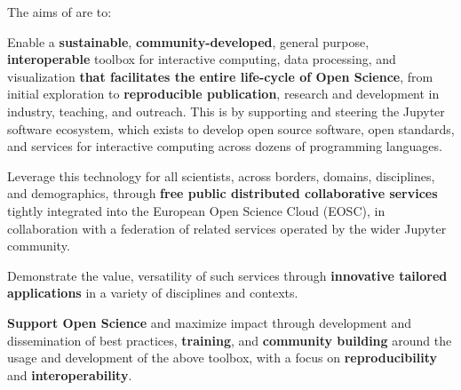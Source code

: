 
\noindent The aims of \TheProject are to:

\begin{compactenum}
\item Enable a
  \textbf{sustainable}, \textbf{community-developed}, general purpose, \textbf{interoperable} toolbox for
  interactive computing, data processing, and visualization
  \textbf{that facilitates the entire life-cycle of Open Science},
  from initial exploration to \textbf{reproducible publication}, research and development in
  industry, teaching, and outreach.
  This is by supporting and steering the Jupyter software ecosystem,
  which exists to develop open source software,
  open standards, and services for interactive computing across dozens of programming languages.

\item Leverage this technology for all scientists, across borders,
  domains, disciplines, and demographics, through
  \textbf{free public distributed collaborative services} tightly integrated
  into the European Open Science Cloud (EOSC),
  in collaboration with a federation of related services
  operated by the wider Jupyter community.

\item Demonstrate the value, versatility of such services through
  \textbf{innovative tailored applications} in a variety of disciplines and
  contexts.

\item \textbf{Support Open Science} and maximize impact through development and
  dissemination of best practices,
  \textbf{training}, and \textbf{community building}
  around the usage and development of the above toolbox,
  with a focus on \textbf{reproducibility} and
  \textbf{interoperability}.
\end{compactenum}

